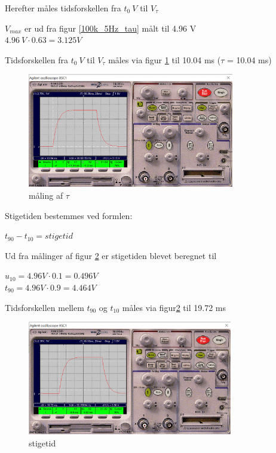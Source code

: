 Herefter måles tidsforskellen fra $t_0 \ V$ til $V_{\tau}$

$V_{max}$ er ud fra figur \ref{100k_5Hz_tau} målt til 4.96 V
\\
$4.96 \ V \cdot 0.63 = 3.125 V$

Tidsforskellen fra $t_0 \ V$ til $V_{\tau}$ måles via figur \ref{100k.5Hz.tau} til 10.04 ms ($\tau$ = 10.04 ms)

\begin{figure}[h]
 \begin{center}
  \includegraphics[height=5cm]{P_Fig/figur6_100k_5Hz_tau.png}
  \caption{måling af $\tau$}
  \label{100k.5Hz.tau}
 \end{center}
\end{figure}

\newpage

Stigetiden bestemmes ved formlen:
\begin{center}
$t_{90} - t_{10} = stigetid$
\end{center}

Ud fra målinger af figur \ref{100k.5Hz.stigetid}
er stigetiden blevet beregnet til
\begin{center}
$u_{10} = 4.96 V \cdot 0.1 = 0.496 V$ \\
$t_{90} = 4.96 V \cdot 0.9 = 4.464 V$
\end{center}

Tidsforskellen mellem $t_{90}$ og $t_{10}$ måles via figur\ref{100k.5Hz.stigetid} til 19.72 ms

\begin{figure}[h]
 \begin{center}
  \includegraphics[height=5cm]{P_Fig/figur7_100k_5Hz_stigetid}
  \caption{stigetid}
  \label{100k.5Hz.stigetid}
 \end{center}
\end{figure}

